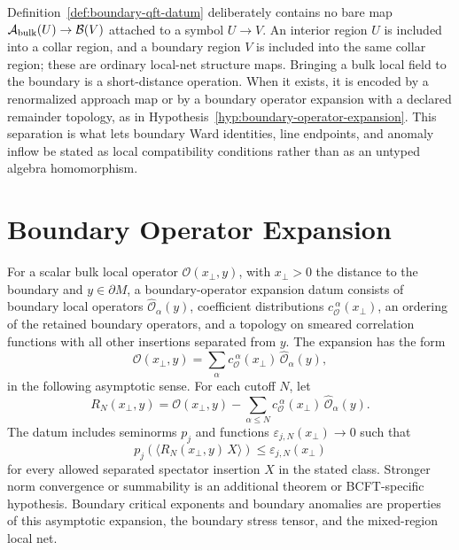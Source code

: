 Definition~\ref{def:boundary-qft-datum} deliberately contains no bare map
\(\mathcal A_{\rm bulk}(U)\to\mathcal B(V)\) attached to a symbol \(U\to V\).
An interior region \(U\) is included into a collar region, and a boundary
region \(V\) is included into the same collar region; these are ordinary
local-net structure maps.  Bringing a bulk local field to the boundary is a
short-distance operation.  When it exists, it is encoded by a renormalized
approach map or by a boundary operator expansion with a declared remainder
topology, as in Hypothesis~\ref{hyp:boundary-operator-expansion}.  This
separation is what lets boundary Ward identities, line endpoints, and anomaly
inflow be stated as local compatibility conditions rather than as an
untyped algebra homomorphism.

\section{Boundary Operator Expansion}

\begin{hypothesis}
\label{hyp:boundary-operator-expansion}
For a scalar bulk local operator \(\mathcal O(x_\perp,y)\), with
\(x_\perp>0\) the distance to the boundary and \(y\in\partial M\), a
boundary-operator expansion datum consists of boundary local operators
\(\widehat{\mathcal O}_\alpha(y)\), coefficient distributions
\(c_{\mathcal O}^{\ \alpha}(x_\perp)\), an ordering of the retained boundary
operators, and a topology on smeared correlation functions with all other
insertions separated from \(y\).  The expansion has the form
\[
  \mathcal O(x_\perp,y)
  =
  \sum_\alpha
  c_{\mathcal O}^{\ \alpha}(x_\perp)\,\widehat{\mathcal O}_\alpha(y),
\]
in the following asymptotic sense.  For each cutoff \(N\), let
\[
  R_N(x_\perp,y)
  =
  \mathcal O(x_\perp,y)
  -
  \sum_{\alpha\leq N}
  c_{\mathcal O}^{\ \alpha}(x_\perp)\,\widehat{\mathcal O}_\alpha(y).
\]
The datum includes seminorms \(p_j\) and functions
\(\varepsilon_{j,N}(x_\perp)\to0\) such that
\[
  p_j\!\left(
    \langle R_N(x_\perp,y)\,X\rangle
  \right)
  \leq
  \varepsilon_{j,N}(x_\perp)
\]
for every allowed separated spectator insertion \(X\) in the stated class.
Stronger norm convergence or summability is an additional theorem or
BCFT-specific hypothesis.  Boundary critical exponents and boundary anomalies
are properties of this asymptotic expansion, the boundary stress tensor, and
the mixed-region local net.
\end{hypothesis}


